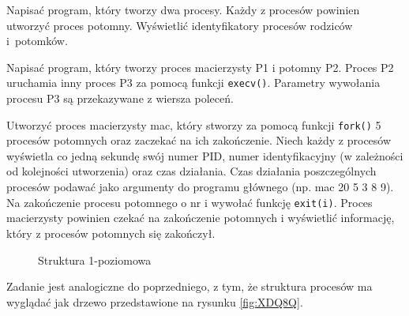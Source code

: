 \begin{myenumerate}
  \item Napisać program, który tworzy dwa procesy. Każdy z procesów powinien
        utworzyć proces potomny. Wyświetlić identyfikatory procesów rodziców
        i~potomków.
  \item Napisać program, który tworzy proces macierzysty P1 i  potomny P2.
        Proces P2 uruchamia inny proces P3 za pomocą funkcji \texttt{execv()}.
        Parametry wywołania procesu P3 są przekazywane z wiersza poleceń.
  \item Utworzyć proces macierzysty mac, który stworzy za pomocą funkcji
        \texttt{fork()} 5 procesów potomnych oraz zaczekać na ich zakończenie.
        Niech każdy z procesów wyświetla co jedną sekundę swój numer PID, numer
        identyfikacyjny (w zależności od kolejności utworzenia) oraz czas
        działania. Czas działania poszczególnych procesów podawać jako
        argumenty do programu głównego (np.  mac 20 5 3 8 9). Na zakończenie
        procesu potomnego o nr i wywołać funkcję \texttt{exit(i)}. Proces
        macierzysty powinien czekać na zakończenie potomnych i wyświetlić
        informację, który z procesów potomnych się zakończył.
        \begin{figure}[!h]
          \centering
          \caption{Struktura 1-poziomowa}
          \label{fig:YT6VA}
        \end{figure}

  \item Zadanie jest analogiczne do poprzedniego, z tym, że struktura procesów
        ma wyglądać jak drzewo przedstawione na rysunku \ref{fig:XDQ8Q}.
        \begin{figure}[!h]
          \centering
\end{figure}
\end{myenumerate}
